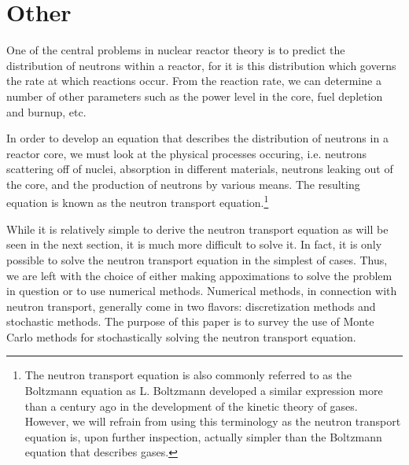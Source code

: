 \section{Other}

One of the central problems in nuclear reactor theory is to predict
the distribution of neutrons within a reactor, for it is this
distribution which governs the rate at which reactions occur. From the
reaction rate, we can determine a number of other parameters such as
the power level in the core, fuel depletion and burnup, etc.

In order to develop an equation that describes the distribution of
neutrons in a reactor core, we must look at the physical processes
occuring, i.e. neutrons scattering off of nuclei, absorption in
different materials, neutrons leaking out of the core, and the
production of neutrons by various means. The resulting equation is
known as the neutron transport equation.\footnote{The neutron
  transport equation is also commonly referred to as the Boltzmann
  equation as L. Boltzmann developed a similar expression more than a
  century ago in the development of the kinetic theory of
  gases. However, we will refrain from using this terminology as the
  neutron transport equation is, upon further inspection, actually
  simpler than the Boltzmann equation that describes gases.}

While it is relatively simple to derive the neutron transport equation
as will be seen in the next section, it is much more difficult to
solve it. In fact, it is only possible to solve the neutron transport
equation in the simplest of cases. Thus, we are left with the choice
of either making appoximations to solve the problem in question or to
use numerical methods. Numerical methods, in connection with neutron
transport, generally come in two flavors: discretization methods and
stochastic methods. The purpose of this paper is to survey the use of
Monte Carlo methods for stochastically solving the neutron transport
equation.


